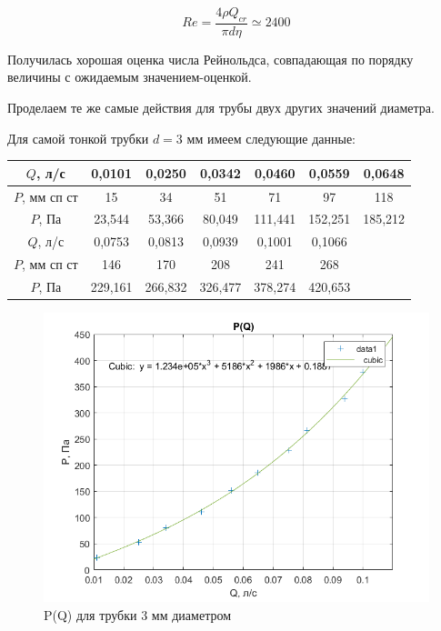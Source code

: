 \documentclass[a4paper, 12pt]{article} %
\begin{document}
\begin{equation}
	Re = \frac{4 \rho Q_{cr}}{\pi d \eta} \simeq 2400
\end{equation}

Получилась хорошая оценка числа Рейнольдса, совпадающая по порядку величины с ожидаемым значением-оценкой.

Проделаем те же самые действия для трубы двух других значений диаметра.

Для самой тонкой трубки $d = 3$ мм имеем следующие данные:

\begin{table}[]
\begin{tabular}{|c|c|c|c|c|c|c|}
\hline
$Q$, л/с      & 0,0101  & 0,0250   & 0,0342  & 0,0460    & 0,0559   & 0,0648   \\ \hline
$P$, мм сп ст & 15       & 34      & 51       & 71       & 97       & 118      \\ \hline
$P$, Па       & 23,544   & 53,366 & 80,049  & 111,441 & 152,251 & 185,212 \\ \hline
$Q$, л/с      & 0,0753   & 0,0813  & 0,0939  & 0,1001      & 0,1066   &          \\ \hline
$P$, мм сп ст & 146      & 170     & 208      & 241      & 268      &          \\ \hline
$P$, Па       & 229,161 & 266,832 & 326,477 & 378,274 & 420,653 &          \\ \hline
\end{tabular}
\end{table}

\begin{figure}[!h]
    \centering
    \includegraphics[width = 12 cm]{3mm}
    \caption{P(Q) для трубки 3 мм диаметром}
    \label{fig:vac}
\end{figure}
\end{document}
